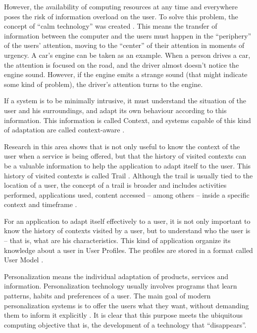 \documentclass{svjour3}                     %
\begin{document}
However, the availability of computing resources at any time and everywhere
poses the risk of information overload on the user. To solve this problem, the
concept of ``calm technology'' was created \citep{weiser96}. This means the
transfer of information between the computer and the users must happen in the
``periphery'' of the users' attention, moving to the ``center'' of their
attention in moments of urgency. A car's engine can be taken as an example. When
a person drives a car, the attention is focused on the road, and the driver almost doesn't notice the engine sound. However, if the engine emits a strange sound (that might indicate some kind of problem), the driver's attention turns to the engine.

If a system is to be minimally intrusive, it must understand the situation of
the user and his surroundings, and adapt its own behaviour according to this
information. This information is called Context, and systems capable of this
kind of adaptation are called context-aware \citep{satyanarayanan01,dey2001}. 

Research in this area shows that is not only useful to know the context of the
user when a service is being offered, but that the history of visited contexts
can be a valuable information to help the application to adapt itself to the
user. This history of visited contexts is called Trail \citep{driver08}. Although
the trail is usually tied to the location of a user, the concept of a trail is
broader and includes activities performed, applications used, content accessed
-- among others -- inside a specific context and timeframe \citep{silva10}.


For an application to adapt itself effectively to a user, it is not only important to know the history of contexts visited by a user, but to understand who the user is -- that is, what are his characteristics. This kind of application organize its knowledge about a user in User Profiles. The profiles are stored in a format called User Model \citep{fischer01,viviani10}.


Personalization means the individual adaptation of products, services and information. Personalization technology usually involves programs that learn patterns, habits and preferences of a user. The main goal of modern personalization systems is to offer the users what they want, without demanding them to inform it explicitly \citep{mulvenna00}. It is clear that this purpose meets the ubiquitous computing objective that is, the development of a technology that ``disappears''.
\end{document}

